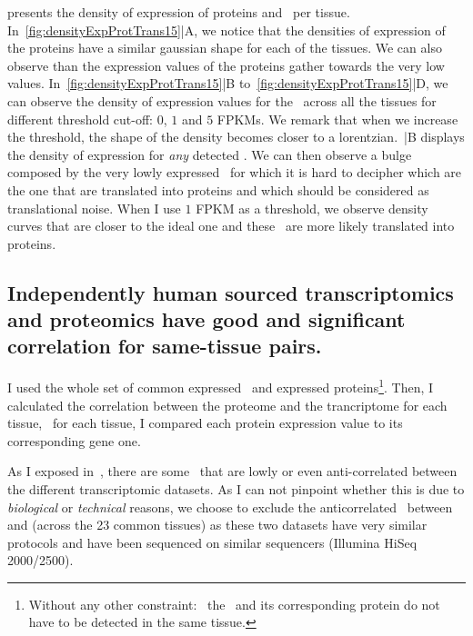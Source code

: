  presents the density of expression
of proteins and \mRNAs\ per tissue. In~\cref{fig:densityExpProtTrans15}|A,
we notice that the densities of expression of the proteins have a similar gaussian
shape for each of the tissues. We can also observe than the expression values
of the proteins gather towards the very low values.
In~\cref{fig:densityExpProtTrans15}|B to~\cref{fig:densityExpProtTrans15}|D,
we can observe the density of expression values for
the \mRNAs\ across all the tissues for
different threshold cut-off: $0$, $1$ and $5$ \glspl{FPKM}.
We remark that when we increase the threshold, the shape
of the density becomes closer to a lorentzian.~|B
displays the density of expression for \emph{any} detected \mRNA\@. We can
then observe a bulge composed by the very lowly expressed \mRNAs\, for which it
is hard to decipher which are the one that are translated into proteins and which
should be considered as translational noise. When I use $1$ \gls{FPKM} as a threshold,
we observe density curves that are closer to the ideal one and these \mRNAs\ are
more likely translated into proteins.


\subsection{Independently human sourced transcriptomics and proteomics
have good and significant correlation for same-tissue pairs.}%
\label{subsec:IntegrationGoodCorrProtTrans}

I used the whole set of common expressed \mRNAs\ and
expressed proteins\footnote{Without any other constraint: \eg\ the \mRNA\ and
its corresponding protein do not have to be detected in the same tissue.}.
Then, I calculated the correlation between the proteome and the trancriptome for
each tissue, \ie\ for each tissue, I compared each protein expression value to
its corresponding gene one.

As I exposed in~, there are some
\mRNAs\ that are lowly or even anti-correlated between the different
transcriptomic datasets.
As I can not pinpoint whether this is due to \emph{biological} or \emph{technical}
reasons, we choose to exclude the anticorrelated \mRNAs\ between  and  (across the 23 common tissues) as these two datasets have
very similar protocols and have been sequenced on similar sequencers (Illumina
HiSeq 2000/2500).

